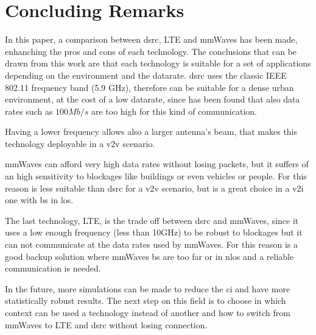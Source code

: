 
\section{Concluding Remarks}
\label{sec:conclusions}

In this paper, a comparison between \gls{dsrc}, LTE and \gls{mmWaves} has been made, enhanching the pros and cons of each technology.
The conclusions that can be drawn from this work are that each technology is suitable for a set of applications depending on the environment and the datarate.
\gls{dsrc} uses the classic IEEE 802.11 frequency band (5.9 GHz), therefore can be suitable for a dense urban environment, at the cost of a low datarate, since has been found that also data rates such as $100Mb/s$ are too high for this kind of communication.

Having a lower frequency allows also a larger antenna's beam, that makes this technology deployable in a \gls{v2v} scenario.

\gls{mmWaves} can afford very high data rates without losing packets, but it suffers of an high sensitivity to blockages like buildings or even vehicles or people. For this reason is less suitable than \gls{dsrc} for a \gls{v2v} scenario, but is a great choice in a \gls{v2i} one with \gls{bs} in \gls{los}.

The last technology, LTE, is the trade off between \gls{dsrc} and \gls{mmWaves}, since it uses a low enough frequency (less than 10GHz) to be robust to blockages but it can not communicate at the data rates used by \gls{mmWaves}. For this reason is a good backup solution where \gls{mmWaves} \gls{bs} are too far or in \gls{nlos} and a reliable communication is needed.

In the future, more simulations can be made to reduce the \gls{ci} and have more statistically robust results.
The next step on this field is to choose in which context can be used a technology instead of another and how to switch from \gls{mmWaves} to LTE and \gls{dsrc} without losing connection.